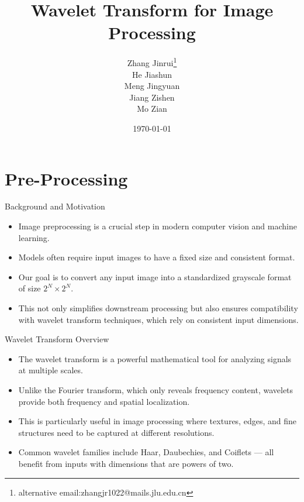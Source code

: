 \documentclass{beamer}
\title{Wavelet Transform for Image Processing}
\author{
\texorpdfstring{
Zhang Jinrui\thanks{alternative email:zhangjr1022@mails.jlu.edu.cn}
\\
He Jiashun
\\
Meng Jingyuan
\\
Jiang Zishen
\\
Mo Zian
}
{
Zhang Jinrui\thanks{alternative email:zhangjr1022@mails.jlu.edu.cn}
,
He Jiashun
,
Meng Jingyuan
,
Jiang Zishen
,
Mo Zian
}
}
\date{\today}
\begin{document}
\frame{\titlepage}  %

\section{Pre-Processing}
\begin{frame}{Background and Motivation}
    \begin{itemize}
        \item Image preprocessing is a crucial step in modern computer vision and machine learning.
        \item Models often require input images to have a fixed size and consistent format.
        \item Our goal is to convert any input image into a standardized grayscale format of size $2^N \times 2^N$.
        \item This not only simplifies downstream processing but also ensures compatibility with wavelet transform techniques, which rely on consistent input dimensions.
    \end{itemize}
\end{frame}

\begin{frame}{Wavelet Transform Overview}
    \begin{itemize}
        \item The wavelet transform is a powerful mathematical tool for analyzing signals at multiple scales.
        \item Unlike the Fourier transform, which only reveals frequency content, wavelets provide both frequency and spatial localization.
        \item This is particularly useful in image processing where textures, edges, and fine structures need to be captured at different resolutions.
        \item Common wavelet families include Haar, Daubechies, and Coiflets — all benefit from inputs with dimensions that are powers of two.
    \end{itemize}
\end{frame}
\end{document}
